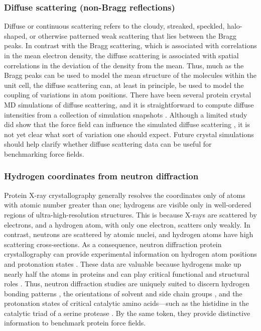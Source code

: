 \documentclass[9pt,review,pubversion]{livecoms}
\begin{document}
\subsubsection{Diffuse scattering (non-Bragg reflections)}
\label{sub2:diffuse}

Diffuse or continuous scattering refers to the cloudy, streaked, speckled, halo-shaped, or otherwise patterned weak scattering that lies between the Bragg peaks.
In contrast with the Bragg scattering, which is associated with correlations in the mean electron density, the diffuse scattering is associated with spatial correlations in the deviation of the density from the mean.
Thus, much as the Bragg peaks can be used to model the mean structure of the molecules within the unit cell, the diffuse scattering can, at least in principle, be used to model the coupling of variations in atom positions.
There have been several protein crystal MD simulations of diffuse scattering, and it is straightforward to compute diffuse intensities from a collection of simulation snapshots \cite{faure_correlated_1994,clarage_sampling_1995,hery_x-ray_1998,meinhold_fluctuations_2005,wall_conformational_2014,wall_internal_2018,wych_liquid-like_2019,meisburger_diffuse_2020,meisburger_robust_2023}.
Although a limited study did show that the force field can influence the simulated diffuse scattering \cite{wych_liquid-like_2019}, it is not yet clear what sort of variation one should expect.
Future crystal simulations should help clarify whether diffuse scattering data can be useful for benchmarking force fields.

\subsubsection{Hydrogen coordinates from neutron diffraction}
\label{sub2:neutron}

Protein X-ray crystallography generally resolves the coordinates only of atoms with atomic number greater than one; hydrogens are visible only in well-ordered regions of ultra-high-resolution structures.
This is because X-rays are scattered by electrons, and a hydrogen atom, with only one electron, scatters only weakly.
In contrast, neutrons are scattered by atomic nuclei, and hydrogen atoms have high scattering cross-sections.
As a consequence, neutron diffraction protein crystallography can provide experimental information on hydrogen atom positions and protonation states \cite{blakeley_neutron_2009,ashkar_neutron_2018}.
These data are valuable because hydrogens make up nearly half the atoms in proteins and can play critical functional and structural roles \cite{word_asparagine_1999,word_visualizing_1999}.
Thus, neutron diffraction studies are uniquely suited to discern hydrogen bonding patterns \cite{chen_direct_2012,nakamura_newtons_2015}, the orientations of solvent and side chain groups \cite{blakeley_15-k_2004,wall_biomolecular_2019}, and the protonation states of critical catalytic amino acids---such as the histidine in the catalytic triad of a serine protease \cite{kossiakoff_neutron_1980,kossiakoff_direct_1981}.
By the same token, they provide distinctive information to benchmark protein force fields.
\end{document}
